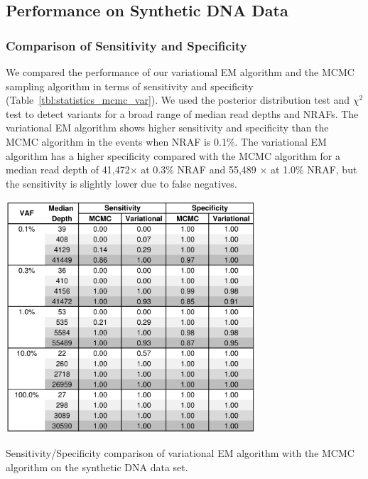 \documentclass[11pt,reqno]{amsart}
\begin{document}
\subsection{Performance on Synthetic DNA Data}
\subsubsection{Comparison of Sensitivity and Specificity}
We compared the performance of our variational EM algorithm and the MCMC sampling algorithm in terms of sensitivity and specificity (Table~\ref{tbl:statistics_mcmc_var}).
We used the posterior distribution test and $\chi^2$ test to detect variants for a broad range of median read depths and NRAFs.
The variational EM algorithm shows higher sensitivity and specificity than the MCMC algorithm in the events when NRAF is 0.1\%.
The variational EM algorithm has a higher specificity compared with the MCMC algorithm for a median read depth of 41,472$\times$ at 0.3\% NRAF and 55,489 $\times$ at 1.0\% NRAF, but the sensitivity is slightly lower due to false negatives.
\begin{table}[ht]
\centering
\includegraphics[width=0.7\textwidth]{tables/statistics_mcmc_var.png}
\caption{Sensitivity/Specificity comparison of variational EM algorithm with the MCMC algorithm on the synthetic DNA data set.}
\label{tbl:statistics_mcmc_var}
\end{table}
\end{document}
